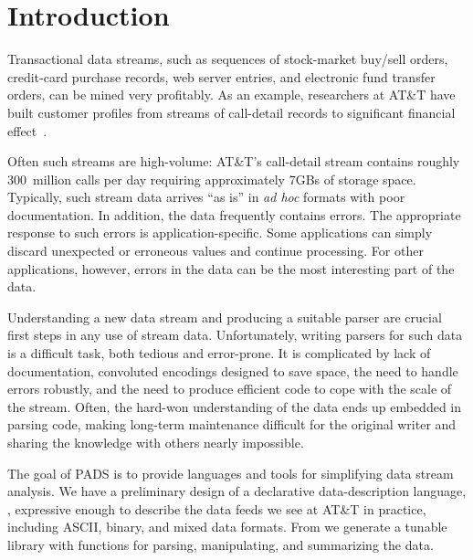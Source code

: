 \chapter{Introduction}
\label{chap:introduction}
Transactional data streams, such as sequences of stock-market buy/sell orders,
credit-card purchase records, web server entries, and electronic fund
transfer orders, can be mined very profitably.  As an example,
researchers at AT\&T have built customer profiles from streams of
call-detail records to significant financial effect~\cite{kdd98,kdd99,kdd00}.   

Often such streams are high-volume: AT\&T's call-detail stream contains
roughly 300~million calls per day requiring approximately 7GBs of
storage space.  Typically, such stream data arrives ``as is'' in
\textit{ad hoc} formats with poor documentation.  In addition, the
data frequently contains errors.  The appropriate response to such
errors is application-specific. Some applications can simply discard
unexpected or erroneous values and continue processing.  For other
applications, however, errors in the data can be the most interesting
part of the data.  

Understanding a new data stream and producing a suitable parser are
crucial first steps in any use of stream data.  Unfortunately, writing
parsers for such data is a difficult task, both tedious and
error-prone. It is complicated by lack of documentation, convoluted
encodings designed to save space, the need to handle errors
robustly, and the need to produce efficient code to cope with the
scale of the stream.  Often, the hard-won understanding of the data
ends up embedded in parsing code, making long-term maintenance
difficult for the original writer and sharing the knowledge with
others nearly impossible.

The goal of PADS is to provide languages and tools for
simplifying data stream analysis.  We have a preliminary design of a
declarative data-description language, \padsl{}, expressive enough to
describe the data feeds we see at AT\&T in practice, including ASCII,
binary, and mixed data formats.  From \padsl{} we generate a tunable \C{}
library with functions for parsing, manipulating, and summarizing the data.  

